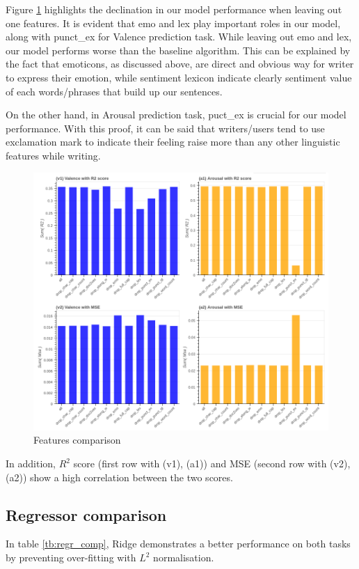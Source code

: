 \documentclass[12pt]{article}
\begin{document}
Figure \ref{fig:features} highlights the declination in our model performance when leaving out one features. It is evident that emo and lex play important roles in our model, along with punct\_ex for Valence prediction task. While leaving out emo and lex, our model performs worse than the baseline algorithm. This can be explained by the fact that emoticons, as discussed above, are direct and obvious way for writer to express their emotion, while sentiment lexicon indicate clearly sentiment value of each words/phrases that build up our sentences.

On the other hand, in Arousal prediction task, puct\_ex is crucial for our model performance. With this proof, it can be said that writers/users tend to use exclamation mark to indicate their feeling raise more than any other linguistic features while writing.

\begin{figure}[H]
	\centering
	\includegraphics[width=\textwidth]{features}
	\caption{Features comparison}
	\label{fig:features}
\end{figure}

In addition, $R^2$ score (first row with (v1), (a1)) and MSE (second row with (v2), (a2)) show a high correlation between the two scores. 

\subsection{Regressor comparison}
In table \ref{tb:regr_comp}, Ridge demonstrates a better performance on both tasks by preventing over-fitting with $L^2$ normalisation.
\end{document}
